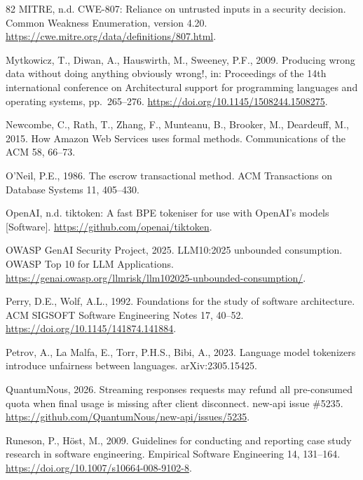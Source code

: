 \documentclass[preprint,3p,authoryear,12pt]{elsarticle}
\begin{document}
\begin{thebibliography}{82}
MITRE, n.d. CWE-807: Reliance on untrusted inputs in a security decision. Common
Weakness Enumeration, version 4.20. \url{https://cwe.mitre.org/data/definitions/807.html}.

Mytkowicz, T., Diwan, A., Hauswirth, M., Sweeney, P.F., 2009. Producing wrong data without doing anything obviously wrong!, in: Proceedings of the 14th international conference on Architectural support for programming languages and operating systems, pp.~265--276. \url{https://doi.org/10.1145/1508244.1508275}.

Newcombe, C., Rath, T., Zhang, F., Munteanu, B., Brooker, M., Deardeuff, M., 2015. How
Amazon Web Services uses formal methods. Communications of the ACM 58, 66--73.

O'Neil, P.E., 1986. The escrow transactional method. ACM Transactions on Database
Systems 11, 405--430.

OpenAI, n.d. tiktoken: A fast BPE tokeniser for use with OpenAI's models [Software].
\url{https://github.com/openai/tiktoken}.

OWASP GenAI Security Project, 2025. LLM10:2025 unbounded consumption. OWASP Top 10 for
LLM Applications.
\url{https://genai.owasp.org/llmrisk/llm102025-unbounded-consumption/}.

Perry, D.E., Wolf, A.L., 1992. Foundations for the study of software architecture. ACM SIGSOFT Software Engineering Notes 17, 40--52. \url{https://doi.org/10.1145/141874.141884}.

Petrov, A., La Malfa, E., Torr, P.H.S., Bibi, A., 2023. Language model tokenizers introduce unfairness between languages. arXiv:2305.15425.

QuantumNous, 2026. Streaming responses requests may refund all pre-consumed quota when
final usage is missing after client disconnect. new-api issue \#5235.
\url{https://github.com/QuantumNous/new-api/issues/5235}.

Runeson, P., H\"{o}st, M., 2009. Guidelines for conducting and reporting case study research in software engineering. Empirical Software Engineering 14, 131--164. \url{https://doi.org/10.1007/s10664-008-9102-8}.


\end{thebibliography}
\end{document}
